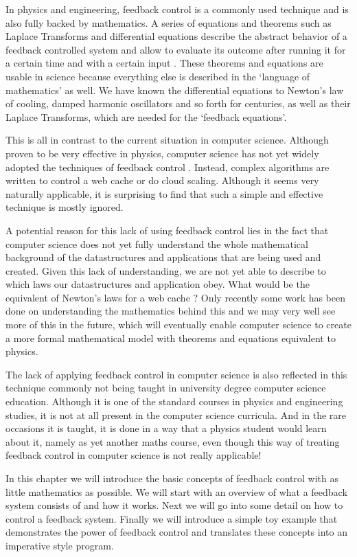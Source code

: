 In physics and engineering, feedback control is a commonly used technique and is also fully backed by mathematics. A series of equations and theorems such as Laplace Transforms and differential equations describe the abstract behavior of a feedback controlled system and allow to evaluate its outcome after running it for a certain time and with a certain input \cite{hellerstein2004-feedback, janert2013-feedback}. These theorems and equations are usable in science because everything else is described in the `language of mathematics' as well. We have known the differential equations to Newton's law of cooling, damped harmonic oscillators and so forth for centuries, as well as their Laplace Transforms, which are needed for the `feedback equations'.

This is all in contrast to the current situation in computer science. Although proven to be very effective in physics, computer science has not yet widely adopted the techniques of feedback control \cite{janert2013-feedback}. Instead, complex algorithms are written to control a web cache or do cloud scaling. Although it seems very naturally applicable, it is surprising to find that such a simple and effective technique is mostly ignored.

A potential reason for this lack of using feedback control lies in the fact that computer science does not yet fully understand the whole mathematical background of the datastructures and applications that are being used and created. Given this lack of understanding, we are not yet able to describe to which laws our datastructures and application obey. What would be the equivalent of Newton's laws for a web cache \cite{janert2013-feedback}? Only recently some work has been done on understanding the mathematics behind this \cite{beckmann2015-cache-calculus} and we may very well see more of this in the future, which will eventually enable computer science to create a more formal mathematical model with theorems and equations equivalent to physics.

The lack of applying feedback control in computer science is also reflected in this technique commonly not being taught in university degree computer science education. Although it is one of the standard courses in physics and engineering studies, it is not at all present in the computer science curricula. And in the rare occasions it is taught, it is done in a way that a physics student would learn about it, namely as yet another maths course, even though this way of treating feedback control in computer science is not really applicable!

In this chapter we will introduce the basic concepts of feedback control with as little mathematics as possible. We will start with an overview of what a feedback system consists of and how it works. Next we will go into some detail on how to control a feedback system. Finally we will introduce a simple toy example that demonstrates the power of feedback control and translates these concepts into an imperative style program.






